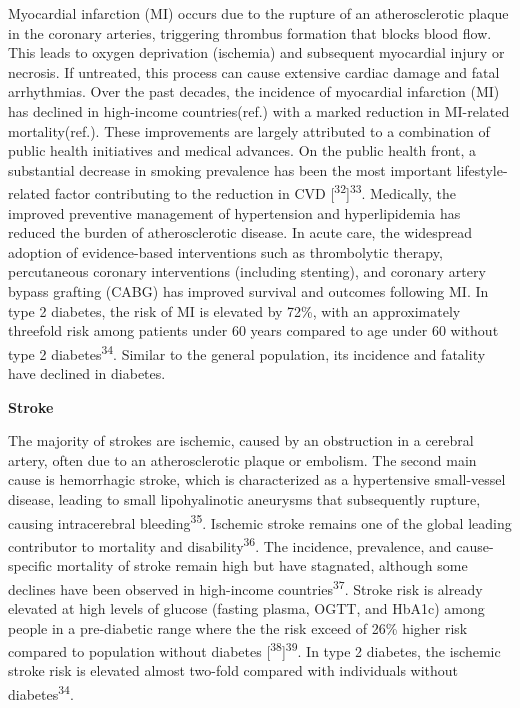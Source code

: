 \documentclass[
  a4paper,
  headsepline=true,
  open=any]{scrbook}
\begin{document}
Myocardial infarction (MI) occurs due to the rupture of an
atherosclerotic plaque in the coronary arteries, triggering thrombus
formation that blocks blood flow. This leads to oxygen deprivation
(ischemia) and subsequent myocardial injury or necrosis. If untreated,
this process can cause extensive cardiac damage and fatal arrhythmias.
Over the past decades, the incidence of myocardial infarction (MI) has
declined in high-income countries(ref.) with a marked reduction in
MI-related mortality(ref.). These improvements are largely attributed to
a combination of public health initiatives and medical advances. On the
public health front, a substantial decrease in smoking prevalence has
been the most important lifestyle-related factor contributing to the
reduction in CVD {[}\textsuperscript{32}{]}\textsuperscript{33}.
Medically, the improved preventive management of hypertension and
hyperlipidemia has reduced the burden of atherosclerotic disease. In
acute care, the widespread adoption of evidence-based interventions such
as thrombolytic therapy, percutaneous coronary interventions (including
stenting), and coronary artery bypass grafting (CABG) has improved
survival and outcomes following MI. In type 2 diabetes, the risk of MI
is elevated by 72\%, with an approximately threefold risk among patients
under 60 years compared to age under 60 without type 2
diabetes\textsuperscript{34}. Similar to the general population, its
incidence and fatality have declined in diabetes.

\textbf{Stroke}

The majority of strokes are ischemic, caused by an obstruction in a
cerebral artery, often due to an atherosclerotic plaque or embolism. The
second main cause is hemorrhagic stroke, which is characterized as a
hypertensive small-vessel disease, leading to small lipohyalinotic
aneurysms that subsequently rupture, causing intracerebral
bleeding\textsuperscript{35}. Ischemic stroke remains one of the global
leading contributor to mortality and disability\textsuperscript{36}. The
incidence, prevalence, and cause-specific mortality of stroke remain
high but have stagnated, although some declines have been observed in
high-income countries\textsuperscript{37}. Stroke risk is already
elevated at high levels of glucose (fasting plasma, OGTT, and HbA1c)
among people in a pre-diabetic range where the the risk exceed of 26\%
higher risk compared to population without diabetes
{[}\textsuperscript{38}{]}\textsuperscript{39}. In type 2 diabetes, the
ischemic stroke risk is elevated almost two-fold compared with
individuals without diabetes\textsuperscript{34}.
\end{document}
